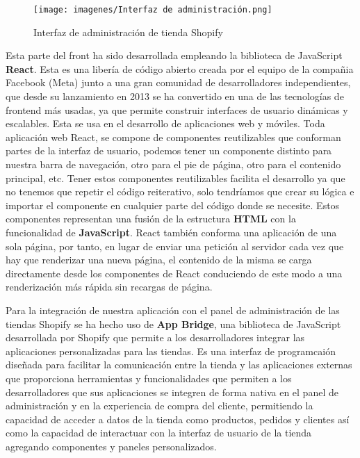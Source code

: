 \documentclass[12pt]{article}
\begin{document}
\begin{figure}[ht]
    \centering
    \texttt{[image: imagenes/Interfaz de administración.png]}
    \caption{\label{fig:1}Interfaz de administración de tienda Shopify}
    \vspace{\fill}
\end{figure}

Esta parte del front ha sido desarrollada empleando la biblioteca de JavaScript \textbf{React}. Esta es una libería de código abierto creada por el equipo de la
compañia Facebook (Meta) junto a una gran comunidad de desarrolladores independientes, que desde su lanzamiento en 2013 se ha convertido en una
de las tecnologías de frontend más usadas, ya que permite construir interfaces de usuario dinámicas y escalables. Esta se usa en el desarrollo de aplicaciones web y móviles. \cite{react-pag-1}
Toda aplicación web React, se compone de componentes reutilizables que conforman partes de la interfaz de usuario, podemos tener un componente distinto para
nuestra barra de navegación, otro para el pie de página, otro para el contenido principal, etc.
Tener estos componentes reutilizables facilita el desarrollo ya que no tenemos que repetir el código reiterativo, solo tendríamos que crear su lógica e
importar el componente en cualquier parte del código donde se necesite. Estos componentes representan una fusión de la estructura \textbf{HTML} con la funcionalidad de \textbf{JavaScript}.
React también conforma una aplicación de una sola página, por tanto, en lugar de enviar una petición al servidor cada vez que hay que renderizar una nueva página,
el contenido de la misma se carga directamente desde los componentes de React conduciendo de este modo a una renderización más rápida sin recargas de página. \cite{react-pag-2}

Para la integración de nuestra aplicación con el panel de administración de las tiendas Shopify se ha hecho uso de \textbf{App Bridge}, una biblioteca de JavaScript
desarrollada por Shopify que permite a los desarrolladores integrar las aplicaciones personalizadas para las tiendas. Es una interfaz
de programcaión diseñada para facilitar la comunicación entre la tienda y las aplicaciones externas que proporciona herramientas y funcionalidades
que permiten a los desarrolladores que sus aplicaciones se integren de forma nativa en el panel de administración y en la experiencia de compra
del cliente, permitiendo la capacidad de acceder a datos de la tienda como productos, pedidos y clientes así como la capacidad de interactuar con la interfaz
de usuario de la tienda agregando componentes y paneles personalizados. \cite{shopify-dev}
\end{document}
